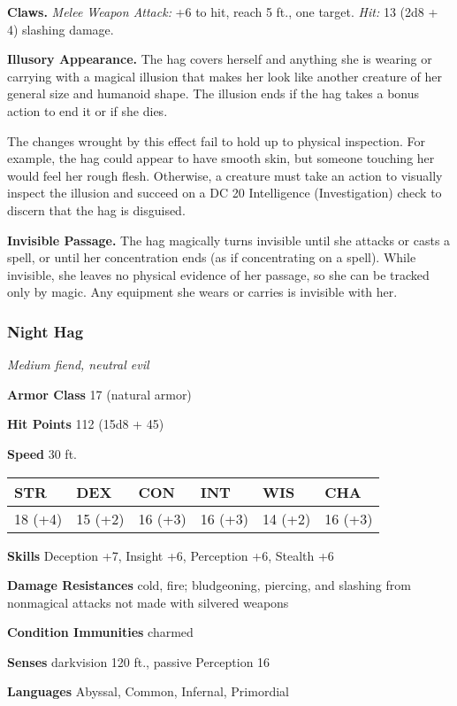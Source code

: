\documentclass[
]{article}
\begin{document}
\textbf{Claws.} \emph{Melee Weapon Attack:} +6 to hit, reach 5 ft., one
target. \emph{Hit:} 13 (2d8 + 4) slashing damage.

\textbf{Illusory Appearance.} The hag covers herself and anything she is
wearing or carrying with a magical illusion that makes her look like
another creature of her general size and humanoid shape. The illusion
ends if the hag takes a bonus action to end it or if she dies.

The changes wrought by this effect fail to hold up to physical
inspection. For example, the hag could appear to have smooth skin, but
someone touching her would feel her rough flesh. Otherwise, a creature
must take an action to visually inspect the illusion and succeed on a DC
20 Intelligence (Investigation) check to discern that the hag is
disguised.

\textbf{Invisible Passage.} The hag magically turns invisible until she
attacks or casts a spell, or until her concentration ends (as if
concentrating on a spell). While invisible, she leaves no physical
evidence of her passage, so she can be tracked only by magic. Any
equipment she wears or carries is invisible with her.

\hypertarget{night-hag}{%
\subsubsection{Night Hag}\label{night-hag}}

\emph{Medium fiend, neutral evil}

\textbf{Armor Class} 17 (natural armor)

\textbf{Hit Points} 112 (15d8 + 45)

\textbf{Speed} 30 ft.

\begin{longtable}[]{@{}llllll@{}}
\toprule
STR & DEX & CON & INT & WIS & CHA\tabularnewline
\midrule
\endhead
18 (+4) & 15 (+2) & 16 (+3) & 16 (+3) & 14 (+2) & 16 (+3)\tabularnewline
\bottomrule
\end{longtable}

\textbf{Skills} Deception +7, Insight +6, Perception +6, Stealth +6

\textbf{Damage Resistances} cold, fire; bludgeoning, piercing, and
slashing from nonmagical attacks not made with silvered weapons

\textbf{Condition Immunities} charmed

\textbf{Senses} darkvision 120 ft., passive Perception 16

\textbf{Languages} Abyssal, Common, Infernal, Primordial
\end{document}
